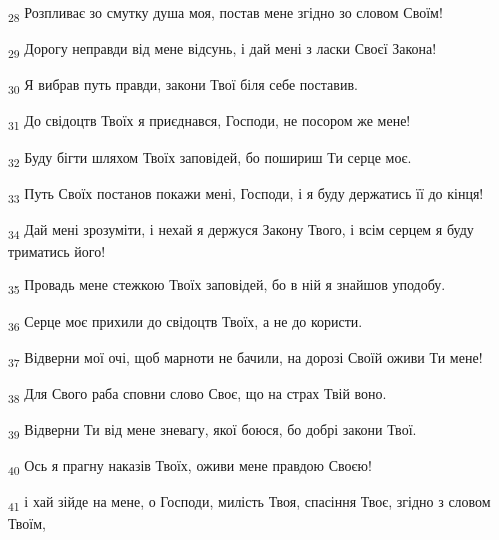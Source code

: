 \begin{tcolorbox}
\textsubscript{28} Розпливає зо смутку душа моя, постав мене згідно зо словом Своїм!
\end{tcolorbox}
\begin{tcolorbox}
\textsubscript{29} Дорогу неправди від мене відсунь, і дай мені з ласки Своєї Закона!
\end{tcolorbox}
\begin{tcolorbox}
\textsubscript{30} Я вибрав путь правди, закони Твої біля себе поставив.
\end{tcolorbox}
\begin{tcolorbox}
\textsubscript{31} До свідоцтв Твоїх я приєднався, Господи, не посором же мене!
\end{tcolorbox}
\begin{tcolorbox}
\textsubscript{32} Буду бігти шляхом Твоїх заповідей, бо пошириш Ти серце моє.
\end{tcolorbox}
\begin{tcolorbox}
\textsubscript{33} Путь Своїх постанов покажи мені, Господи, і я буду держатись її до кінця!
\end{tcolorbox}
\begin{tcolorbox}
\textsubscript{34} Дай мені зрозуміти, і нехай я держуся Закону Твого, і всім серцем я буду триматись його!
\end{tcolorbox}
\begin{tcolorbox}
\textsubscript{35} Провадь мене стежкою Твоїх заповідей, бо в ній я знайшов уподобу.
\end{tcolorbox}
\begin{tcolorbox}
\textsubscript{36} Серце моє прихили до свідоцтв Твоїх, а не до користи.
\end{tcolorbox}
\begin{tcolorbox}
\textsubscript{37} Відверни мої очі, щоб марноти не бачили, на дорозі Своїй оживи Ти мене!
\end{tcolorbox}
\begin{tcolorbox}
\textsubscript{38} Для Свого раба сповни слово Своє, що на страх Твій воно.
\end{tcolorbox}
\begin{tcolorbox}
\textsubscript{39} Відверни Ти від мене зневагу, якої боюся, бо добрі закони Твої.
\end{tcolorbox}
\begin{tcolorbox}
\textsubscript{40} Ось я прагну наказів Твоїх, оживи мене правдою Своєю!
\end{tcolorbox}
\begin{tcolorbox}
\textsubscript{41} і хай зійде на мене, о Господи, милість Твоя, спасіння Твоє, згідно з словом Твоїм,
\end{tcolorbox}
